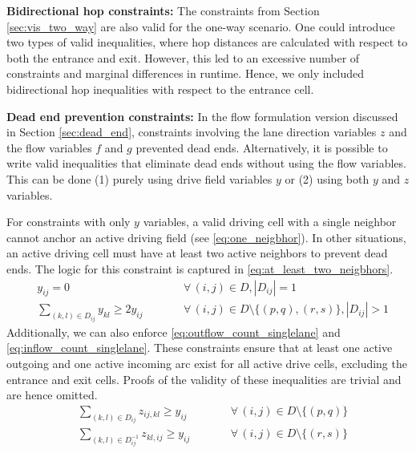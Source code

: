 \documentclass[10pt]{article}
\newcommand{\drivevar}[2]{y_{#1#2}}
\newcommand{\countvar}[4]{z_{#1#2,#3#4}}
\newcommand{\validdriveset}{D}
\newcommand{\gridadjset}[2]{D_{#1#2}}
\newcommand{\gridinvadjset}[2]{D^{-1}_{#1#2}}
\newcommand{\entranceset}{\{(\entrancex, \entrancey)\}}
\newcommand{\exitset}{\{(\exitx, \exity)\}}
\newcommand{\entrancex}{p}
\newcommand{\entrancey}{q}
\newcommand{\exitx}{r}
\newcommand{\exity}{s}
\theoremstyle{definition}
\begin{document}
\textbf{Bidirectional hop constraints:} The constraints from Section \ref{sec:vis_two_way} are also valid for the one-way scenario. One could introduce two types of valid inequalities, where hop distances are calculated with respect to both the entrance and exit. However, this led to an excessive number of constraints and marginal differences in runtime. Hence, we only included bidirectional hop inequalities with respect to the entrance cell. 

\textbf{Dead end prevention constraints:} In the flow formulation version discussed in Section \ref{sec:dead_end}, constraints involving the lane direction variables $z$ and the flow variables $f$ and $g$ prevented dead ends. Alternatively, it is possible to write valid inequalities that eliminate dead ends without using the flow variables. This can be done (1) purely using drive field variables $y$ or (2) using both $y$ and $z$ variables.

For constraints with only $y$ variables, a valid driving cell with a single neighbor cannot anchor an active driving field (see \eqref{eq:one_neigbhor}). In other situations, an active driving cell must have at least two active neighbors to prevent dead ends. The logic for this constraint is captured in \eqref{eq:at_least_two_neigbhors}.
\begin{align}
    &  \drivevar{i}{j} = 0 \qquad && \forall \, (i,j) \in \validdriveset, |\gridadjset{i}{j}| = 1 
     \label{eq:one_neigbhor}\\
     & \sum_{(k, l) \in \gridadjset{i}{j}} \drivevar{k}{l}  \geq 2\drivevar{i}{j} \qquad && \forall \, (i,j) \in  \validdriveset \setminus \{(\entrancex, \entrancey), (\exitx, \exity)\}, |\gridadjset{i}{j}| > 1
     \label{eq:at_least_two_neigbhors}     
\end{align}
Additionally, we can also enforce \eqref{eq:outflow_count_singlelane} and \eqref{eq:inflow_count_singlelane}. These constraints ensure that at least one active outgoing and one active incoming arc exist for all active drive cells, excluding the entrance and exit cells. Proofs of the validity of these inequalities are trivial and are hence omitted. 
\begin{align}
     & \sum_{(k,l) \in \gridadjset{i}{j}} \countvar{i}{j}{k}{l}  \geq \drivevar{i}{j}  \qquad && \forall \, (i,j) \in  \validdriveset \setminus \entranceset
     \label{eq:outflow_count_singlelane}\\
     & \sum_{(k,l) \in \gridinvadjset{i}{j}} \countvar{k}{l}{i}{j} \geq \drivevar{i}{j}  \qquad && \forall \, (i,j) \in  \validdriveset \setminus \exitset
     \label{eq:inflow_count_singlelane}     
\end{align}
\end{document}
